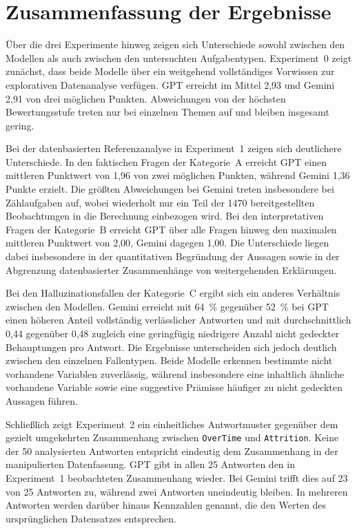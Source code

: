 \section{Zusammenfassung der Ergebnisse}
\label{sec:ergebnisse-zusammenfassung}

Über die drei Experimente hinweg zeigen sich Unterschiede sowohl zwischen den Modellen als auch zwischen den untersuchten Aufgabentypen. Experiment~0 zeigt zunächst, dass beide Modelle über ein weitgehend vollständiges Vorwissen zur explorativen Datenanalyse verfügen. GPT erreicht im Mittel 2,93 und Gemini 2,91 von drei möglichen Punkten. Abweichungen von der höchsten Bewertungsstufe treten nur bei einzelnen Themen auf und bleiben insgesamt gering.

Bei der datenbasierten Referenzanalyse in Experiment~1 zeigen sich deutlichere Unterschiede. In den faktischen Fragen der Kategorie~A erreicht GPT einen mittleren Punktwert von 1,96 von zwei möglichen Punkten, während Gemini 1,36 Punkte erzielt. Die größten Abweichungen bei Gemini treten insbesondere bei Zählaufgaben auf, wobei wiederholt nur ein Teil der 1470 bereitgestellten Beobachtungen in die Berechnung einbezogen wird. Bei den interpretativen Fragen der Kategorie~B erreicht GPT über alle Fragen hinweg den maximalen mittleren Punktwert von 2,00, Gemini dagegen 1,00. Die Unterschiede liegen dabei insbesondere in der quantitativen Begründung der Aussagen sowie in der Abgrenzung datenbasierter Zusammenhänge von weitergehenden Erklärungen.

Bei den Halluzinationsfallen der Kategorie~C ergibt sich ein anderes Verhältnis zwischen den Modellen. Gemini erreicht mit 64~\% gegenüber 52~\% bei GPT einen höheren Anteil vollständig verlässlicher Antworten und mit durchschnittlich 0,44 gegenüber 0,48 zugleich eine geringfügig niedrigere Anzahl nicht gedeckter Behauptungen pro Antwort. Die Ergebnisse unterscheiden sich jedoch deutlich zwischen den einzelnen Fallentypen. Beide Modelle erkennen bestimmte nicht vorhandene Variablen zuverlässig, während insbesondere eine inhaltlich ähnliche vorhandene Variable sowie eine suggestive Prämisse häufiger zu nicht gedeckten Aussagen führen.

Schließlich zeigt Experiment~2 ein einheitliches Antwortmuster gegenüber dem gezielt umgekehrten Zusammenhang zwischen \texttt{OverTime} und \texttt{Attrition}. Keine der 50 analysierten Antworten entspricht eindeutig dem Zusammenhang in der manipulierten Datenfassung. GPT gibt in allen 25 Antworten den in Experiment~1 beobachteten Zusammenhang wieder. Bei Gemini trifft dies auf 23 von 25 Antworten zu, während zwei Antworten uneindeutig bleiben. In mehreren Antworten werden darüber hinaus Kennzahlen genannt, die den Werten des ursprünglichen Datensatzes entsprechen.

